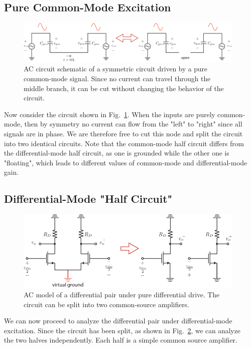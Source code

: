 \subsection{Pure Common-Mode Excitation}
\begin{figure}[tb]
\centering
\includegraphics[width=\columnwidth]{CM_model.pdf}
\caption{AC circuit schematic of a symmetric circuit driven by a pure common-mode signal.  Since no current can travel through the middle branch, it can be cut without changing the behavior of the circuit.}
\label{fig:CM_model.pdf}
\end{figure}
Now consider the circuit shown in Fig.~\ref{fig:CM_model.pdf}.  When the inputs are purely common-mode, then by symmetry no current can flow from the "left" to "right" since all signals are in phase.  We are therefore free to cut this node and split the circuit into two identical circuits.  Note that the common-mode half circuit differs from the differential-mode half circuit, as one is grounded while the other one is "floating", which leads to different values of common-mode and differential-mode gain.
\subsection{Differential-Mode "Half Circuit"}
\begin{figure}[tb]
\centering
\includegraphics[scale=1]{Diff_Pair_DM_Drive.pdf}
\caption{AC model of a differential pair under pure differential drive.   The circuit can be split into two common-source amplifiers.}
\label{fig:Diff_Pair_DM_Drive.pdf}
\end{figure}
We can now proceed to analyze the differential pair under differential-mode excitation.  Since the circuit has been split, as shown in Fig.~\ref{fig:Diff_Pair_DM_Drive.pdf}, we can analyze the two halves independently.  Each half is a simple common source amplifier.
